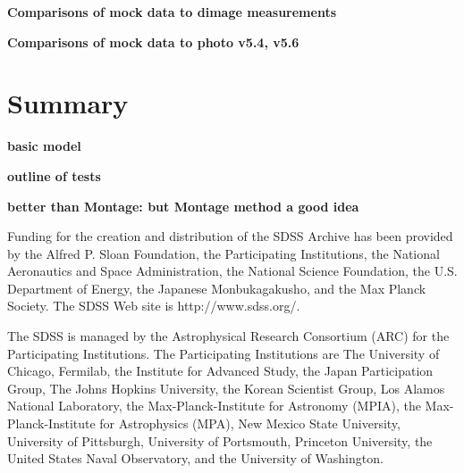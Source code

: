 \documentclass[10pt,preprint]{aastex}
\begin{document}
{\bf Comparisons of mock data to dimage measurements}

{\bf Comparisons of mock data to photo v5.4, v5.6}

\section{ Summary}

{\bf basic model}

{\bf outline of tests}

{\bf better than Montage: but Montage method a good idea}


\acknowledgments

Funding for the creation and distribution of the SDSS Archive has been
provided by the Alfred P. Sloan Foundation, the Participating
Institutions, the National Aeronautics and Space Administration, the
National Science Foundation, the U.S. Department of Energy, the
Japanese Monbukagakusho, and the Max Planck Society. The SDSS Web site
is http://www.sdss.org/.

The SDSS is managed by the Astrophysical Research Consortium (ARC) for
the Participating Institutions. The Participating Institutions are The
University of Chicago, Fermilab, the Institute for Advanced Study, the
Japan Participation Group, The Johns Hopkins University, the Korean
Scientist Group, Los Alamos National Laboratory, the
Max-Planck-Institute for Astronomy (MPIA), the Max-Planck-Institute
for Astrophysics (MPA), New Mexico State University, University of
Pittsburgh, University of Portsmouth, Princeton University, the United
States Naval Observatory, and the University of Washington.




\newpage


%
\end{document}
